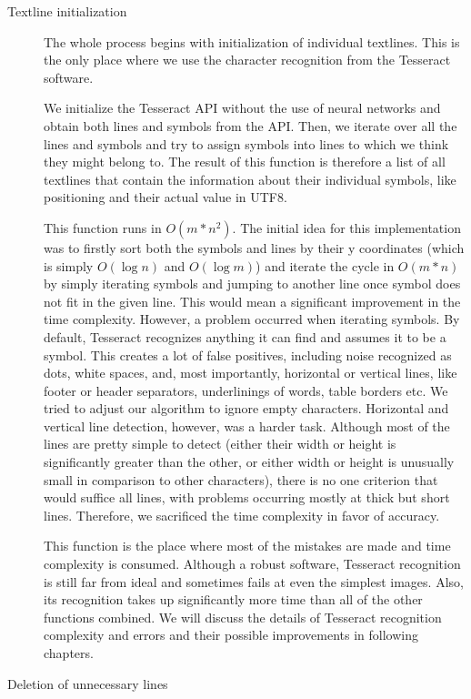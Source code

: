\begin{description}
\item[Textline initialization] The whole process begins with initialization of individual textlines. This is the only place where we use the character recognition from the Tesseract software.

We initialize the Tesseract API without the use of neural networks and obtain both lines and symbols from the API. Then, we iterate over all the lines and symbols and try to assign symbols into lines to which we think they might belong to. The result of this function is therefore a list of all textlines that contain the information about their individual symbols, like positioning and their actual value in UTF8.

This function runs in $O(m*n^2)$. The initial idea for this implementation was to firstly sort both the symbols and lines by their y coordinates (which is simply $O(\log n)$ and  $O(\log m)$) and iterate the cycle in $O(m*n)$ by simply iterating symbols and jumping to another line once symbol does not fit in the given line. This would mean a significant improvement in the time complexity. However, a problem occurred when iterating symbols. By default, Tesseract recognizes anything it can find and assumes it to be a symbol. This creates a lot of false positives, including noise recognized as dots, white spaces, and, most importantly, horizontal or vertical lines, like footer or header separators, underlinings of words, table borders etc. We tried to adjust our algorithm to ignore empty characters. Horizontal and vertical line detection, however, was a harder task. Although most of the lines are pretty simple to detect (either their width or height is significantly greater than the other, or either width or height is unusually small in comparison to other characters), there is no one criterion that would suffice all lines, with problems occurring mostly at thick but short lines. Therefore, we sacrificed  the time complexity in favor of accuracy.

This function is the place where most of the mistakes are made and time complexity is consumed. Although a robust software, Tesseract recognition is still far from ideal and sometimes fails at even the simplest images. Also, its recognition takes up significantly more time than all of the other functions combined. We will discuss the details of Tesseract recognition complexity and errors and their possible improvements in following chapters.

\item[Deletion of unnecessary lines]


\end{description}
